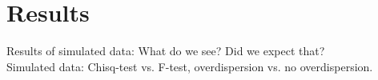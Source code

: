 \section{Results}

Results of simulated data: What do we see? Did we expect that?\\
Simulated data: Chisq-test vs. F-test, overdispersion vs. no overdispersion.
  
  
  
  
  